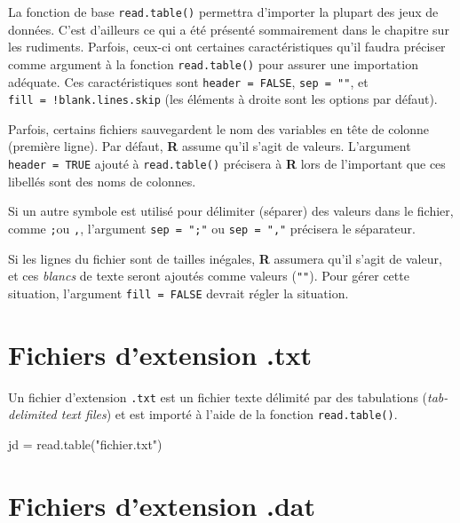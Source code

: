 \documentclass[
]{book}
\newenvironment{Shaded}{}{}
\newcommand{\FunctionTok}[1]{#1}
\newcommand{\NormalTok}[1]{#1}
\newcommand{\OtherTok}[1]{#1}
\newcommand{\StringTok}[1]{#1}
\begin{document}
La fonction de base \texttt{read.table()} permettra d'importer la plupart des jeux de données. C'est d'ailleurs ce qui a été présenté sommairement dans le chapitre sur les rudiments. Parfois, ceux-ci ont certaines caractéristiques qu'il faudra préciser comme argument à la fonction \texttt{read.table()} pour assurer une importation adéquate. Ces caractéristiques sont \texttt{header\ =\ FALSE}, \texttt{sep\ =\ ""}, et \texttt{fill\ =\ !blank.lines.skip} (les éléments à droite sont les options par défaut).

Parfois, certains fichiers sauvegardent le nom des variables en tête de colonne (première ligne). Par défaut, \textbf{R} assume qu'il s'agit de valeurs. L'argument \texttt{header\ =\ TRUE} ajouté à \texttt{read.table()} précisera à \textbf{R} lors de l'important que ces libellés sont des noms de colonnes.

Si un autre symbole est utilisé pour délimiter (séparer) des valeurs dans le fichier, comme \texttt{;}ou \texttt{,}, l'argument \texttt{sep\ =\ ";"} ou \texttt{sep\ =\ ","} précisera le séparateur.

Si les lignes du fichier sont de tailles inégales, \textbf{R} assumera qu'il s'agit de valeur, et ces \emph{blancs} de texte seront ajoutés comme valeurs (\texttt{""}). Pour gérer cette situation, l'argument \texttt{fill\ =\ FALSE} devrait régler la situation.

\hypertarget{fichiers-dextension-.txt}{%
\section{Fichiers d'extension .txt}\label{fichiers-dextension-.txt}}

Un fichier d'extension \texttt{.txt} est un fichier texte délimité par des tabulations (\emph{tab-delimited text files}) et est importé à l'aide de la fonction \texttt{read.table()}.

\begin{Shaded}
\begin{Highlighting}[]
\NormalTok{jd }\OtherTok{=} \FunctionTok{read.table}\NormalTok{(}\StringTok{"fichier.txt"}\NormalTok{)}
\end{Highlighting}
\end{Shaded}

\hypertarget{fichiers-dextension-.dat}{%
\section{Fichiers d'extension .dat}\label{fichiers-dextension-.dat}}
\end{document}
